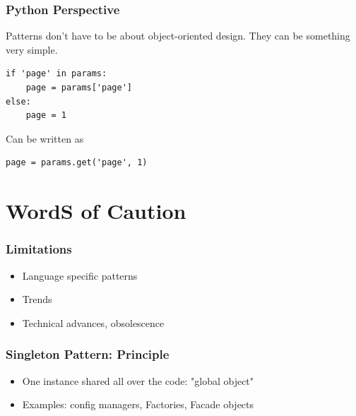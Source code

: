 \documentclass{beamer}
\begin{document}

\begin{frame}[fragile]
\frametitle{Python Perspective}
Patterns don't have to be about object-oriented design. They can be something very simple.
\linebreak
\linebreak
\begin{verbatim}
if 'page' in params:
    page = params['page']
else:
    page = 1
\end{verbatim}
\linebreak
Can be written as
\linebreak
\begin{verbatim}
page = params.get('page', 1)
\end{verbatim}
\end{frame}

\section{WordS of Caution}
\begin{frame}
 \frametitle{Limitations}
\begin{itemize}
 \item Language specific patterns
 \item Trends
 \item Technical advances, obsolescence
\end{itemize}
\end{frame}

\begin{frame}
\frametitle{Singleton Pattern: Principle}
\begin{itemize}
 \item One instance shared all over the code: "global object"
 \item Examples: config managers, Factories, Facade objects
\end{itemize}
\end{frame} 
\end{document}
